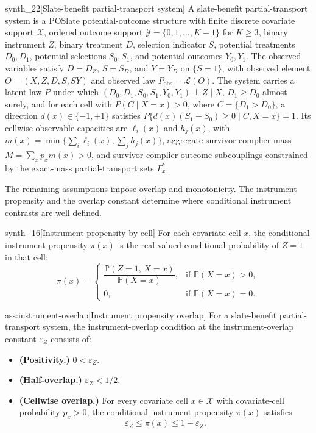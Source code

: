 \documentclass[11pt]{article}
\begin{document}
\begin{definitionv}{synth_22}[Slate-benefit partial-transport system]
A slate-benefit partial-transport system is a POSlate potential-outcome structure with finite discrete covariate support \(\mathcal X\), ordered outcome support \(\mathcal Y=\{0,1,\ldots,K-1\}\) for \(K\ge3\), binary instrument \(Z\), binary treatment \(D\), selection indicator \(S\), potential treatments \(D_0,D_1\), potential selections \(S_0,S_1\), and potential outcomes \(Y_0,Y_1\). The observed variables satisfy \(D=D_Z\), \(S=S_D\), and \(Y=Y_D\) on \(\{S=1\}\), with observed element \(O=(X,Z,D,S,SY)\) and observed law \(P_{\mathrm{obs}}=\mathcal L(O)\). The system carries a latent law \(P\) under which \((D_0,D_1,S_0,S_1,Y_0,Y_1)\perp Z\mid X\), \(D_1\ge D_0\) almost surely, and for each cell with \(P(C\mid X=x)>0\), where \(C=\{D_1>D_0\}\), a direction \(d(x)\in\{-1,+1\}\) satisfies \(P\{d(x)(S_1-S_0)\ge0\mid C,X=x\}=1\). Its cellwise observable capacities are \(\ell_i(x)\) and \(h_j(x)\), with \(m(x)=\min\{\sum_i\ell_i(x),\sum_jh_j(x)\}\), aggregate survivor-complier mass \(M=\sum_xp_xm(x)>0\), and survivor-complier outcome subcouplings constrained by the exact-mass partial-transport sets \(\Gamma_x^{\ast}\).
\end{definitionv}

The remaining assumptions impose overlap and monotonicity. The instrument propensity  and the overlap constant  determine where conditional instrument contrasts are well defined.

\begin{definitionv}{synth_16}[Instrument propensity by cell]
For each covariate cell \(x\), the conditional instrument propensity \(\pi(x)\) is the real-valued conditional probability of \(Z=1\) in that cell:
\[
\pi(x)
=
\begin{cases}
\dfrac{\mathbb P(Z=1,\,X=x)}{\mathbb P(X=x)}, & \text{if } \mathbb P(X=x)>0,\\
0, & \text{if } \mathbb P(X=x)=0.
\end{cases}
\]
\end{definitionv}

\begin{assumptionv}{ass:instrument-overlap}[Instrument propensity overlap]
For a slate-benefit partial-transport system, the instrument-overlap condition at the instrument-overlap constant \(\varepsilon_Z\) consists of:
\begin{itemize}
\item \textbf{(Positivity.)} \(0<\varepsilon_Z\).
\item \textbf{(Half-overlap.)} \(\varepsilon_Z<1/2\).
\item \textbf{(Cellwise overlap.)} For every covariate cell \(x\in\mathcal X\) with covariate-cell probability \(p_x>0\), the conditional instrument propensity \(\pi(x)\) satisfies
\[
\varepsilon_Z\le \pi(x)\le 1-\varepsilon_Z .
\]
\end{itemize}
\end{assumptionv}
\end{document}
